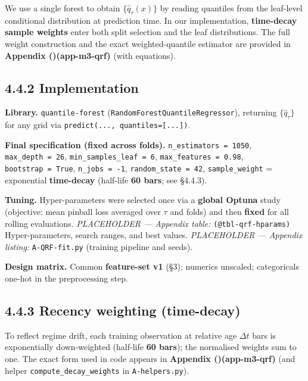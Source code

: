 \documentclass[
  a4paper,
  DIV=11,
  numbers=noendperiod]{scrreprt}
\begin{document}
We use a single forest to obtain \(\{\widehat q_\tau(x)\}\) by reading
quantiles from the leaf-level conditional distribution at prediction
time. In our implementation, \textbf{time-decay sample weights} enter
both split selection and the leaf distributions. The full weight
construction and the exact weighted-quantile estimator are provided in
\textbf{Appendix ()(app-m3-qrf)} (with
equations).

\subsection{4.4.2 Implementation}\label{implementation}

\textbf{Library.} \texttt{quantile-forest}
(\texttt{RandomForestQuantileRegressor}), returning
\(\{\widehat q_\tau\}\) for any grid via
\texttt{predict(...,\ quantiles={[}...{]})}.

\textbf{Final specification (fixed across folds).}
\texttt{n\_estimators\ =\ 1050}, \texttt{max\_depth\ =\ 26},
\texttt{min\_samples\_leaf\ =\ 6}, \texttt{max\_features\ =\ 0.98},
\texttt{bootstrap\ =\ True}, \texttt{n\_jobs\ =\ -1},
\texttt{random\_state\ =\ 42}, \texttt{sample\_weight} = exponential
\textbf{time-decay} (half-life \textbf{60 bars}; see §4.4.3).

\textbf{Tuning.} Hyper-parameters were selected once via a
\textbf{global Optuna} study (objective: mean pinball loss averaged over
\(\tau\) and folds) and then \textbf{fixed} for all rolling evaluations.
\emph{PLACEHOLDER --- Appendix table:} \texttt{(@tbl-qrf-hparams)}
Hyper-parameters, search ranges, and best values. \emph{PLACEHOLDER ---
Appendix listing:} \texttt{A-QRF-fit.py} (training pipeline and seeds).

\textbf{Design matrix.} Common \textbf{feature-set v1} (§3); numerics
unscaled; categoricals one-hot in the preprocessing step.

\subsection{4.4.3 Recency weighting
(time-decay)}\label{recency-weighting-time-decay}

To reflect regime drift, each training observation at relative age
\(\Delta t\) bars is exponentially down-weighted (half-life \textbf{60
bars}); the normalised weights sum to one. The exact form used in code
appears in \textbf{Appendix
()(app-m3-qrf)} (and helper
\texttt{compute\_decay\_weights} in \texttt{A-helpers.py}).
\end{document}
